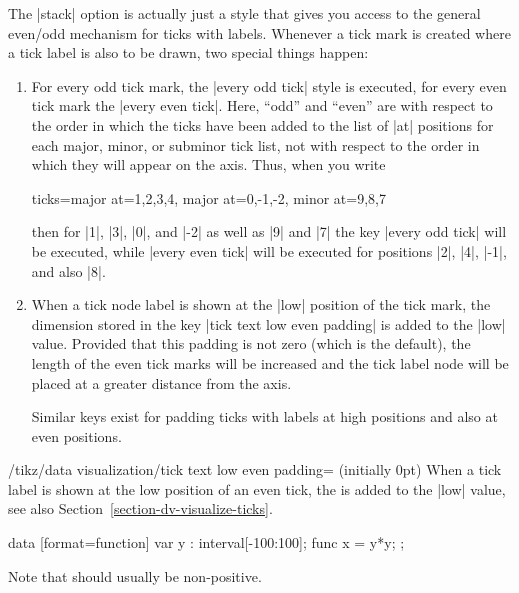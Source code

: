 The |stack| option is actually just a style that gives you access to the
general even/odd mechanism for ticks with labels. Whenever a tick mark is
created where a tick label is also to be drawn, two special things happen:
%
\begin{enumerate}
    \item For every odd tick mark, the |every odd tick| style is executed, for
        every even tick mark the |every even tick|. Here, ``odd'' and ``even''
        are with respect to the order in which the ticks have been added to the
        list of |at| positions for each major, minor, or subminor tick list,
        not with respect to the order in which they will appear on the axis.
        Thus, when you write
\begin{codeexample}
ticks={major at={1,2,3,4}, major at={0,-1,-2}, minor at={9,8,7}}
\end{codeexample}
        then for |1|, |3|, |0|, and |-2| as well as |9| and |7| the key
        |every odd tick| will be executed, while |every even tick| will be
        executed for positions |2|, |4|, |-1|, and also |8|.
    \item When a tick node label is shown at the |low| position of the tick
        mark, the dimension stored in the key |tick text low even padding| is
        added to the |low| value. Provided that this padding is not zero (which
        is the default), the length of the even tick marks will be increased
        and the tick label node will be placed at a greater distance from the
        axis.

        Similar keys exist for padding ticks with labels at high positions and
        also at even positions.
\end{enumerate}

\begin{key}{/tikz/data visualization/tick text low even padding= (initially 0pt)}
    When a tick label is shown at the low position of an even tick, the
     is added to the |low| value, see also
    Section~\ref{section-dv-visualize-ticks}.
\begin{codeexample}[preamble={\usetikzlibrary{datavisualization.formats.functions}}]
\tikz \datavisualization [scientific axes,
                          all axes={length=2.5cm},
                          x axis={ticks={tick text low even padding=-1em}},
                          visualize as smooth line]
  data [format=function] {
    var y : interval[-100:100];
    func x = \value y*\value y;
  };
\end{codeexample}
    Note that  should usually be non-positive.
\end{key}

